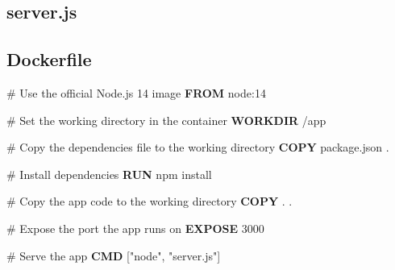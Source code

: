 \documentclass[
  a4paper,
  DIV=11,
  numbers=noendperiod,
  onepage,
  openany]{scrreprt}
\newenvironment{Shaded}{\begin{snugshade}}{\end{snugshade}}
\newcommand{\BuiltInTok}[1]{\textcolor[rgb]{0.00,0.23,0.31}{#1}}
\newcommand{\CommentTok}[1]{\textcolor[rgb]{0.37,0.37,0.37}{#1}}
\newcommand{\DecValTok}[1]{\textcolor[rgb]{0.68,0.00,0.00}{#1}}
\newcommand{\ExtensionTok}[1]{\textcolor[rgb]{0.00,0.23,0.31}{#1}}
\newcommand{\FunctionTok}[1]{\textcolor[rgb]{0.28,0.35,0.67}{#1}}
\newcommand{\KeywordTok}[1]{\textcolor[rgb]{0.00,0.23,0.31}{\textbf{#1}}}
\newcommand{\NormalTok}[1]{\textcolor[rgb]{0.00,0.23,0.31}{#1}}
\newcommand{\OperatorTok}[1]{\textcolor[rgb]{0.37,0.37,0.37}{#1}}
\newcommand{\PreprocessorTok}[1]{\textcolor[rgb]{0.68,0.00,0.00}{#1}}
\newcommand{\SpecialCharTok}[1]{\textcolor[rgb]{0.37,0.37,0.37}{#1}}
\newcommand{\StringTok}[1]{\textcolor[rgb]{0.13,0.47,0.30}{#1}}
\newcommand{\VerbatimStringTok}[1]{\textcolor[rgb]{0.13,0.47,0.30}{#1}}
\begin{document}
\subsection{server.js}\label{server.js}

\begin{Shaded}
\end{Shaded}

\subsection{Dockerfile}\label{dockerfile-1}

\begin{Shaded}
\begin{Highlighting}[]
\CommentTok{\# Use the official Node.js 14 image}
\KeywordTok{FROM}\NormalTok{ node:14}

\CommentTok{\# Set the working directory in the container}
\KeywordTok{WORKDIR}\NormalTok{ /app}

\CommentTok{\# Copy the dependencies file to the working directory}
\KeywordTok{COPY}\NormalTok{ package.json .}

\CommentTok{\# Install dependencies}
\KeywordTok{RUN} \ExtensionTok{npm}\NormalTok{ install}

\CommentTok{\# Copy the app code to the working directory}
\KeywordTok{COPY}\NormalTok{ . .}

\CommentTok{\# Expose the port the app runs on}
\KeywordTok{EXPOSE}\NormalTok{ 3000}

\CommentTok{\# Serve the app}
\KeywordTok{CMD}\NormalTok{ [}\StringTok{"node"}\NormalTok{, }\StringTok{"server.js"}\NormalTok{]}
\end{Highlighting}
\end{Shaded}
\end{document}
